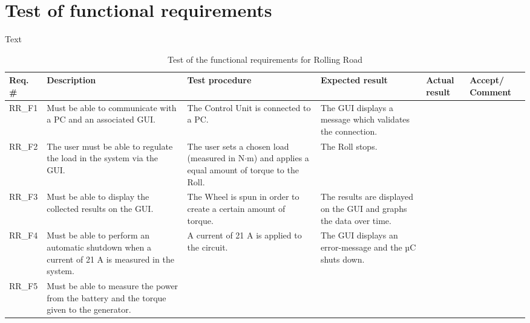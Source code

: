 \section{Test of functional requirements}
Text

\begin{table}[h!]
	\centering
	\label{my-label}
	\begin{tabular}{|p{1.5 cm}|p{2.1 cm}|p{2.1 cm}|p{2.1 cm}|p{2.1 cm}|p{2.1 cm}|}
		\hline
		\textbf{Req. \#} & \textbf{Description} & \textbf{Test procedure} & 
		\textbf{Expected result} & \textbf{Actual result} & \textbf{Accept/ Comment} \\ \hline
		RR\_F1 
		& Must be able to communicate with a PC and an associated GUI.
		& The Control Unit is connected to a PC.
		& The GUI displays a message which validates the connection.
		&
		& \\ \hline
		RR\_F2
		& The user must be able to regulate the load in the system via the GUI.
		& The user sets a chosen load (measured in N$\cdot$m) and applies a equal amount of torque to the Roll.
		& The Roll stops.
		& 
		& \\ \hline
		RR\_F3 
		& Must be able to display the collected results on the GUI.
		& The Wheel is spun in order to create a certain amount of torque.
		& The results are displayed on the GUI and graphs the data over time.
		& 
		& \\ \hline
		RR\_F4 
		& Must be able to perform an automatic shutdown when a current of 21 A is measured in the system.
		& A current of 21 A is applied to the circuit.
		& The GUI displays an error-message and the µC shuts down.
		&
		& \\ \hline
		RR\_F5 
		& Must be able to measure the power from the battery and the torque given to the generator. 
		& 
		&
		&
		& \\ \hline
	\end{tabular}
	\caption{Test of the functional requirements for Rolling Road}
\end{table}